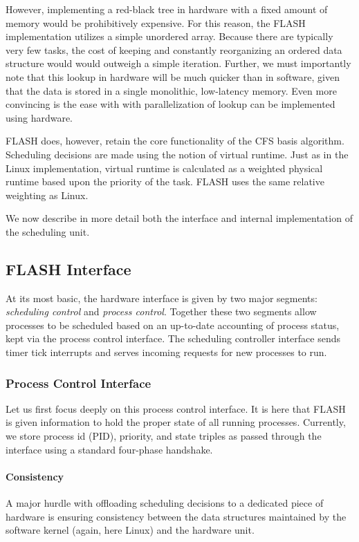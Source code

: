 \documentclass{sig-alternate-10pt}
\begin{document}
However, implementing a red-black tree in hardware with a fixed amount of
memory would be prohibitively expensive.  For this reason, the FLASH
implementation utilizes a simple unordered array.  Because there are
typically very few tasks, the cost of keeping and constantly reorganizing an
ordered data structure would would outweigh a simple iteration.  Further, we
must importantly note that this lookup in hardware will be much quicker than
in software, given that the data is stored in a single monolithic,
low-latency memory.  Even more convincing is the ease with with
parallelization of lookup can be implemented using hardware.

FLASH does, however, retain the core functionality of the CFS basis
algorithm.  Scheduling decisions are made using the notion of virtual
runtime.   Just as in the Linux implementation, virtual runtime is
calculated as a weighted physical runtime based upon the priority of the
task.  FLASH uses the same relative weighting as Linux.

We now describe in more detail both the interface and internal
implementation of the scheduling unit.

\subsection{FLASH Interface}
At its most basic, the hardware interface is given by two major segments:
\emph{scheduling control} and \emph{process control}.  Together these two
segments allow processes to be scheduled based on an up-to-date accounting
of process status, kept via the process control interface.  The scheduling
controller interface sends timer tick interrupts and serves incoming
requests for new processes to run.

\subsubsection{Process Control Interface}
Let us first focus deeply on this process control interface.  It is here
that FLASH is given information to hold the proper state of all running
processes.  Currently, we store process id (PID), priority, and state
triples as passed through the interface using a standard four-phase
handshake.

\paragraph{Consistency} A major hurdle with offloading scheduling decisions
to a dedicated piece of hardware is ensuring consistency between the data
structures maintained by the software kernel (again, here Linux) and the
hardware unit.
\end{document}
